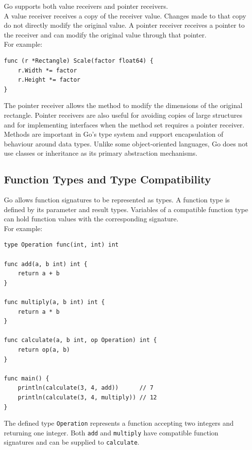 Go supports both value receivers and pointer receivers.\\

A value receiver receives a copy of the receiver value. Changes made to that copy do not directly modify the original value. A pointer receiver receives a pointer to the receiver and can modify the original value through that pointer.\\

For example:

\begin{lstlisting}
func (r *Rectangle) Scale(factor float64) {
    r.Width *= factor
    r.Height *= factor
}
\end{lstlisting}

The pointer receiver allows the method to modify the dimensions of the original rectangle. Pointer receivers are also useful for avoiding copies of large structures and for implementing interfaces when the method set requires a pointer receiver.\\

Methods are important in Go's type system and support encapsulation of behaviour around data types. Unlike some object-oriented languages, Go does not use classes or inheritance as its primary abstraction mechanisms.

\subsection{Function Types and Type Compatibility}

Go allows function signatures to be represented as types. A function type is defined by its parameter and result types. Variables of a compatible function type can hold function values with the corresponding signature.\\

For example:

\begin{lstlisting}
type Operation func(int, int) int

func add(a, b int) int {
    return a + b
}

func multiply(a, b int) int {
    return a * b
}

func calculate(a, b int, op Operation) int {
    return op(a, b)
}

func main() {
    println(calculate(3, 4, add))      // 7
    println(calculate(3, 4, multiply)) // 12
}
\end{lstlisting}

The defined type \texttt{Operation} represents a function accepting two integers and returning one integer. Both \texttt{add} and \texttt{multiply} have compatible function signatures and can be supplied to \texttt{calculate}.\\

